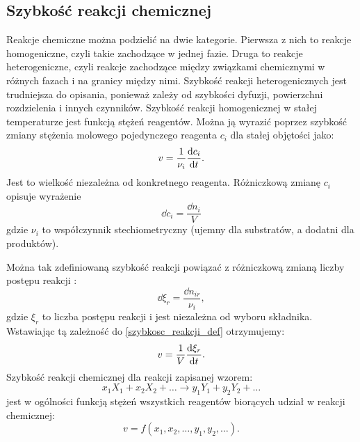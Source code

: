 \documentclass[10pt, a4paper, twoside, onecolumn]{article}
\numberwithin{equation}{section}
\begin{document}
	\subsection{Szybkość reakcji chemicznej}
	Reakcje chemiczne można podzielić na dwie kategorie. Pierwsza z nich to reakcje homogeniczne, czyli takie zachodzące w jednej fazie. Druga to reakcje heterogeniczne, czyli reakcje zachodzące między związkami chemicznymi w różnych fazach i na granicy między nimi. Szybkość reakcji heterogenicznych jest trudniejsza do opisania, ponieważ zależy od szybkości dyfuzji, powierzchni rozdzielenia i innych czynników. %
	Szybkość reakcji homogenicznej w stałej temperaturze jest funkcją stężeń reagentów. Można ją wyrazić poprzez szybkość zmiany stężenia molowego pojedynczego reagenta $c_{i}$ dla stałej objętości jako: 
	\begin{equation}\label{szybkosc_reakcji_def}
		v=\frac{1}{\nu_i}\dv{c_i}{t}.
	\end{equation}
	Jest to wielkość niezależna od konkretnego reagenta. Różniczkową zmianę $c_{i}$ opisuje wyrażenie
	\begin{equation}
		\dd{c_{i}}=\frac{\dd{n_{i}}}{V}
	\end{equation}
	gdzie \(\nu_{i}\) to współczynnik stechiometryczny (ujemny dla substratów, a dodatni dla produktów). \par
	Można tak zdefiniowaną szybkość reakcji powiązać z różniczkową zmianą liczby postępu reakcji \cite{atkins_por}:
	\begin{equation}
		\dd{\xi_{r}}=\frac{\dd{n_{ir}}}{\nu_{i}},
	\end{equation}
	gdzie \(\xi_{r}\) to liczba postępu reakcji i jest niezależna od wyboru składnika. Wstawiając tą zależność do \eqref{szybkosc_reakcji_def} otrzymujemy: 
	\begin{equation}
		v=\frac{1}{V}\dv{\xi_{r}}{t}.
	\end{equation}
	Szybkość reakcji chemicznej dla reakcji zapisanej wzorem:
	\begin{equation*}
		x_{1}X_{1}+x_{2}X_{2}+\ldots \rightarrow y_{1}Y_{1}+y_{2}Y_{2}+\ldots
	\end{equation*}
	jest w ogólności funkcją stężeń wszystkich reagentów biorących udział w reakcji chemicznej: 
	\begin{equation*}
		v=f\left(x_{1}, x_{2}, \ldots, y_{1}, y_{2}, \ldots\right).
	\end{equation*}
\end{document}
